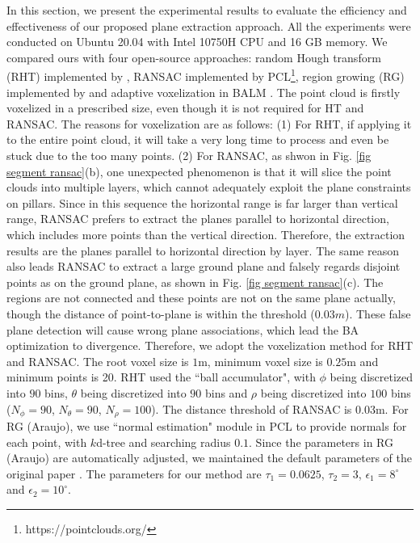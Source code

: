 \documentclass[letterpaper, 10 pt, conference]{ieeeconf}  %
\begin{document}
In this section, we present the experimental results to evaluate the efficiency and effectiveness of our proposed plane extraction approach. All the experiments were conducted on Ubuntu 20.04 with Intel 10750H CPU and 16 GB memory. We compared ours with four open-source approaches: random Hough transform (RHT) implemented by \cite{borrmann20113d}, RANSAC implemented by PCL\footnote{https://pointclouds.org/}, region growing (RG) implemented by \cite{araujo2020robust} and adaptive voxelization in BALM \cite{liu2021balm}. The point cloud is firstly voxelized in a prescribed size, even though it is not required for HT and RANSAC. The reasons for voxelization are as follows: 
{(1) For RHT, if applying it to the entire point cloud, it will take a very long time to process and even be stuck due to the too many points. (2) For RANSAC, as shwon in Fig. \ref{fig segment ransac}(b), one unexpected phenomenon is that it will slice the point clouds into multiple layers, which cannot adequately exploit the plane constraints on pillars. Since in this sequence the horizontal range is far larger than vertical range, RANSAC prefers to extract the planes parallel to horizontal direction, which includes more points than the vertical direction. Therefore, the extraction results are the planes parallel to horizontal direction by layer. The same reason also leads RANSAC to extract a large ground plane and falsely regards disjoint points as on the ground plane, as shown in Fig. \ref{fig segment ransac}(c). The regions are not connected and these points are not on the same plane actually, though the distance of point-to-plane is within the threshold ($0.03m$). These false plane detection will cause wrong plane associations, which lead the BA optimization to divergence. Therefore, we adopt the voxelization method for RHT and RANSAC.} The root voxel size is $1$m, minimum voxel size is $0.25$m and minimum points is 20. {RHT used the ``ball accumulator", with $\phi$ being discretized into $90$ bins, $\theta$ being discretized into $90$ bins and $\rho$ being discretized into $100$ bins ($N_{\phi}=90$, $N_{\theta}=90$, $N_{\rho}=100$).} The distance threshold of RANSAC is $0.03$m. For RG (Araujo), we use ``normal estimation" module in PCL to provide normals for each point, with $k$d-tree and searching radius $0.1$. Since the parameters in RG (Araujo) are automatically adjusted, we maintained the default parameters of the original paper \cite{araujo2020robust}. The parameters for our method are $\tau_1 = 0.0625$, $\tau_2 = 3$, $\epsilon_1 = 8^{\circ}$ and $\epsilon_2 = 10^{\circ}$.
\end{document}
